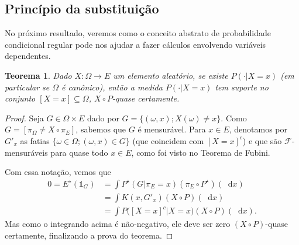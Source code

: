 \documentclass[reqno]{article}
\newcommand*\1{\mathds{1}}
\newtheorem{theorem}{Teorema}[section]
\renewcommand*\d{\mathop{}\!\mathrm{d}}
\begin{document}
\subsection{Princípio da substituição}

No próximo resultado, veremos como o conceito abstrato de probabilidade condicional regular pode nos ajudar a fazer cálculos envolvendo variáveis dependentes.

\begin{theorem}
  Dado $X: \Omega \to E$ um elemento aleatório, se existe $P(\cdot | X = x)$ (em particular se $\Omega$ é canônico), então a medida $P(\cdot | X = x)$ tem suporte no conjunto $[X = x] \subseteq \Omega$, $X \circ P$-quase certamente.
\end{theorem}

\begin{proof}
  Seja $G \in \Omega \times E$ dado por $G = \{(\omega, x); X(\omega) \neq x\}$.
  Como $G = [\pi_\Omega \neq X \circ \pi_E]$, sabemos que $G$ é mensurável.
  Para $x \in E$, denotamos por $G'_x$ as fatias $\{\omega \in \Omega; (\omega, x) \in G\}$ (que coincidem com $[X = x]^c$) e que são $\mathcal{F}$-mensuráveis para quase todo $x \in E$, como foi visto no Teorema de Fubini.

  Com essa notação, vemos que
  \begin{equation}
    \begin{split}
      0 = E^\star (\1_G) & = \int P^\star(G | \pi_E = x) (\pi_E \circ P^\star) (\d x)\\
      & = \int K(x, G'_x) (X \circ P) (\d x)\\
      & = \int P\big( [X = x]^c | X = x \big) (X \circ P) (\d x).
    \end{split}
  \end{equation}
  Mas como o integrando acima é não-negativo, ele deve ser zero $(X \circ P)$-quase certamente, finalizando a prova do teorema.
\end{proof}
\end{document}
